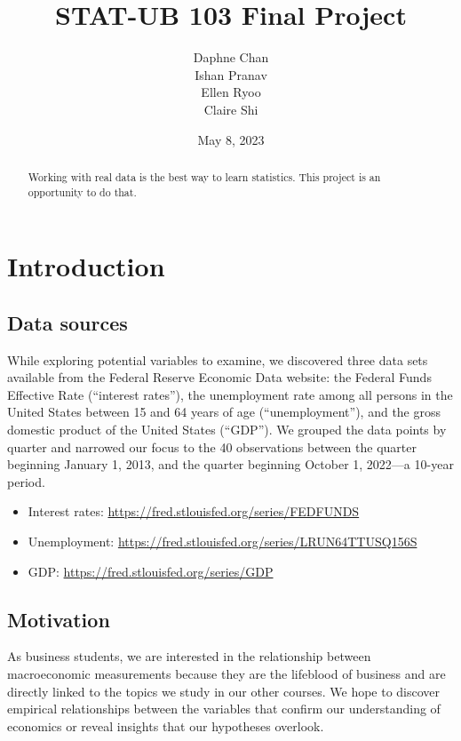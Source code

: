 \documentclass[12pt]{article}
\begin{document}
\def\spacingset#1{\renewcommand{\baselinestretch}
{#1}\small\normalsize} \spacingset{1}
\title{\bf STAT-UB 103 Final Project}
\author{Daphne Chan\\
Ishan Pranav\\
Ellen Ryoo\\
Claire Shi}
\date{May 8, 2023}
\maketitle
\bigskip
\begin{abstract}
Working with real data is the best way to learn statistics. This project is an opportunity to do that.
\end{abstract}
\newpage
\spacingset{1.08}
\section{Introduction}
\subsection{Data sources}
While exploring potential variables to examine, we discovered three data sets available from the Federal Reserve Economic Data website: the Federal Funds Effective Rate (``interest rates''), the unemployment rate among all persons in the United States between 15 and 64 years of age (``unemployment''), and the gross domestic product of the United States (``GDP''). We grouped the data points by quarter and narrowed our focus to the 40 observations between the quarter beginning January 1, 2013, and the quarter beginning October 1, 2022---a 10-year period. 
\begin{itemize}
\item Interest rates: \url{https://fred.stlouisfed.org/series/FEDFUNDS}
\item Unemployment: \url{https://fred.stlouisfed.org/series/LRUN64TTUSQ156S}
\item GDP: \url{https://fred.stlouisfed.org/series/GDP}
\end{itemize}
\subsection{Motivation}
As business students, we are interested in the relationship between macroeconomic measurements because they are the lifeblood of business and are directly linked to the topics we study in our other courses. We hope to discover empirical relationships between the variables that confirm our understanding of economics or reveal insights that our hypotheses overlook. 
\end{document}
